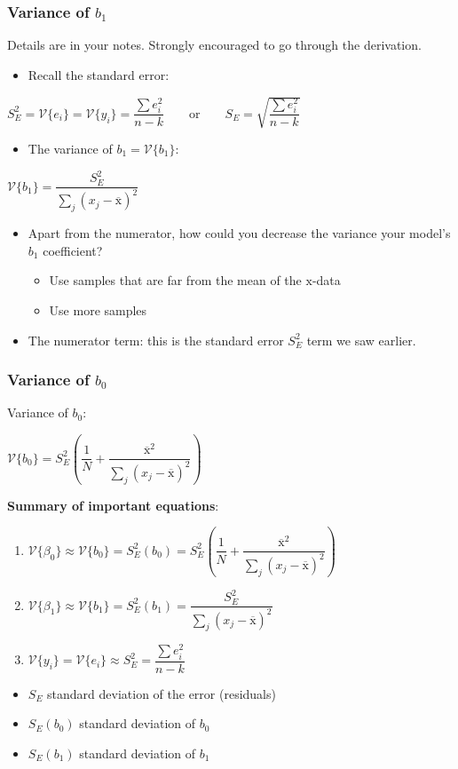 \begin{frame}\frametitle{Variance of $b_1$}
	
	Details are in your notes. Strongly encouraged to go through the derivation.
	\begin{itemize}
		\item	Recall the standard error: 
	\end{itemize}
	
	$ S_E^2 = \mathcal{V}\{e_i\} = \mathcal{V}\{y_i\} = \dfrac{\sum{e_i^2}}{n-k} \qquad \text{or}\qquad S_E = \sqrt{ \dfrac{\sum{e_i^2}}{n-k} } $
	\begin{itemize}
		\item	The variance of $b_1 = \mathcal{V}\{b_1\}$: 
	\end{itemize}
	$ \mathcal{V}\{b_1\} = \dfrac{S_E^2}{\sum_j{\left( x_j - \overline{\mathrm{x}} \right)^2}} $
	\begin{itemize}
		\item	Apart from the numerator, how could you decrease the variance your model's $b_1$ coefficient? 
		\begin{itemize}
			\item	Use samples that are far from the mean of the $\mathrm{x}$-data 
			\item	Use more samples 
		\end{itemize}
		\item	The numerator term: this is the standard error $S_E^2$ term we saw earlier. 
	\end{itemize}
\end{frame}

\begin{frame}\frametitle{Variance of $b_0$}
	
	Variance of $b_0$:
	
	$ \mathcal{V}\{b_0\} = S_E^2 \left(\dfrac{1}{N} + \dfrac{\overline{\mathrm{x}}^2}{\sum_j{\left( x_j - \overline{\mathrm{x}} \right)^2}} \right) $
	
	\textbf{Summary of important equations}:
	\begin{enumerate}
		\item	$\mathcal{V}\{\beta_0\} \approx \mathcal{V}\{b_0\} = S_E^2(b_0) = S_E^2 \left(\dfrac{1}{N} + \dfrac{\overline{\mathrm{x}}^2}{\sum_j{\left( x_j - \overline{\mathrm{x}} \right)^2}} \right)$ 
		\item	$\mathcal{V}\{\beta_1\} \approx \mathcal{V}\{b_1\} = S_E^2(b_1) = \dfrac{S_E^2}{\sum_j{\left( x_j - \overline{\mathrm{x}} \right)^2}}$ 
		\item	$\mathcal{V}\{y_i\} = \mathcal{V}\{e_i\} \approx S_E^2 = \dfrac{\sum{e_i^2}}{n-k}$ 
	\end{enumerate}
	\begin{itemize}
		\item	$S_E$ standard deviation of the error (residuals) 
		\item	$S_E(b_0)$ standard deviation of $b_0$ 
		\item	$S_E(b_1)$ standard deviation of $b_1$ 
	\end{itemize}
\end{frame}


